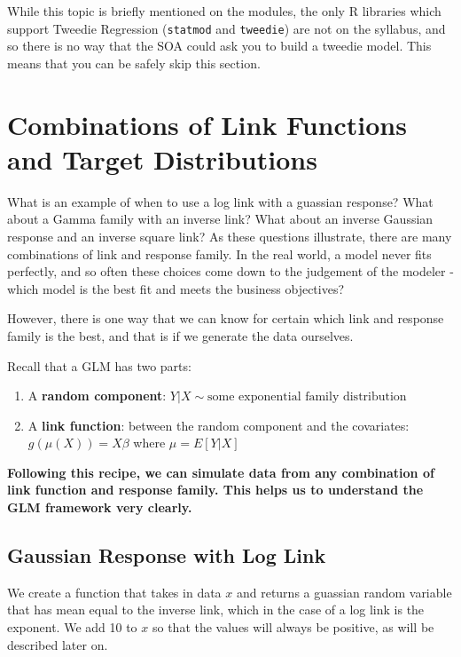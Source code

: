 \documentclass[openany]{book}
\begin{document}
While this topic is briefly mentioned on the modules, the only R libraries which support Tweedie Regression (\texttt{statmod} and \texttt{tweedie}) are not on the syllabus, and so there is no way that the SOA could ask you to build a tweedie model. This means that you can be safely skip this section.

\hypertarget{combinations-of-link-functions-and-target-distributions}{%
\section{Combinations of Link Functions and Target Distributions}\label{combinations-of-link-functions-and-target-distributions}}

What is an example of when to use a log link with a guassian response? What about a Gamma family with an inverse link? What about an inverse Gaussian response and an inverse square link? As these questions illustrate, there are many combinations of link and response family. In the real world, a model never fits perfectly, and so often these choices come down to the judgement of the modeler - which model is the best fit and meets the business objectives?

However, there is one way that we can know for certain which link and response family is the best, and that is if we generate the data ourselves.

Recall that a GLM has two parts:

\begin{enumerate}
\def\labelenumi{\arabic{enumi}.}
\item
  A \textbf{random component}: \(Y|X \sim \text{some exponential family distribution}\)
\item
  A \textbf{link function}: between the random component and the covariates: \(g(\mu(X)) = X\beta\) where \(\mu = E[Y|X]\)
\end{enumerate}

\textbf{Following this recipe, we can simulate data from any combination of link function and response family. This helps us to understand the GLM framework very clearly.}

\hypertarget{gaussian-response-with-log-link}{%
\subsection{Gaussian Response with Log Link}\label{gaussian-response-with-log-link}}

We create a function that takes in data \(x\) and returns a guassian random variable that has mean equal to the inverse link, which in the case of a log link is the exponent. We add 10 to \(x\) so that the values will always be positive, as will be described later on.
\end{document}
